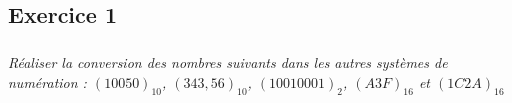 \documentclass[10pt,fleqn]{article} %
\begin{document}
\begin{multicols}{2}
%
%
%
%
%
%
%
%
%

\subsection*{Exercice 1}
\setcounter{subparagraph}{0}
\subparagraph{}\textit{Réaliser la conversion des nombres suivants dans les autres systèmes de numération : $(10050)_{10}$, $(343,56)_{10}$, $(1001 0001)_{2}$, $(A3F)_{16}$ et $(1C2A)_{16}$}




\end{multicols}
\end{document}
